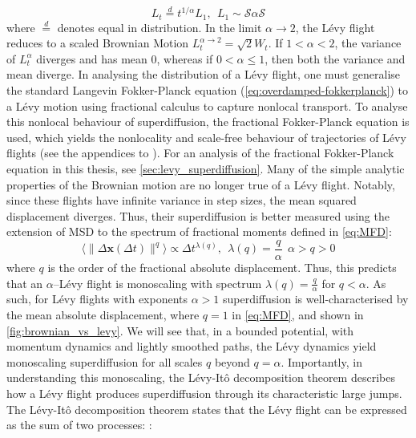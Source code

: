 \begin{equation} \label{eq:levy_noise}
	L_t \stackrel{d}{=} t^{1/\alpha} L_1, \ \ L_1 \sim \mathcal{S}\alpha\mathcal{S}
\end{equation}
where $\stackrel{d}{=}$ denotes equal in distribution. In the limit $\alpha \rightarrow 2$, the Lévy flight reduces to a scaled Brownian Motion $L_t^{\alpha \rightarrow 2} = \sqrt{2}W_t$. If $1 < \alpha < 2$, the variance of $L_t^{\alpha}$ diverges and has mean 0, whereas if $0 < \alpha \leq 1$, then both the variance and mean diverge. In analysing the distribution of a Lévy flight, one must generalise the standard Langevin Fokker-Planck equation (\ref{eq:overdamped-fokkerplanck}) to a Lévy motion using fractional calculus to capture nonlocal transport. To analyse this nonlocal behaviour of superdiffusion, the fractional Fokker-Planck equation is used, which yields the nonlocality and scale-free behaviour of trajectories of Lévy flights (see the appendices to \cite{qi_fractional_2022}). For an analysis of the fractional Fokker-Planck equation in this thesis, see \cref{sec:levy_superdiffusion}. Many of the simple analytic properties of the Brownian motion are no longer true of a Lévy flight. Notably, since these flights have infinite variance in step sizes, the mean squared displacement diverges. Thus, their superdiffusion is better measured using the extension of MSD to the spectrum of fractional moments defined in \cref{eq:MFD}:
\begin{equation}\label{eq:levy-MFD}
	\langle \| \Delta \textbf{x}( \Delta t) \| ^ q \rangle \propto \Delta t^{\lambda(q)}, \ \ \lambda(q) = \frac{q}{\alpha} \ \ \alpha > q > 0
\end{equation}
where $q$ is the order of the fractional absolute displacement. Thus, this predicts that an $\alpha$--Lévy flight is monoscaling with spectrum $\lambda(q) = \frac{q}{\alpha}$ for $q < \alpha$. As such, for Lévy flights with exponents $\alpha > 1$ superdiffusion is well-characterised by the mean absolute displacement, where $q=1$ in \cref{eq:MFD}, and shown in \cref{fig:brownian_vs_levy}. We will see that, in a bounded potential, with momentum dynamics and lightly smoothed paths, the Lévy dynamics yield monoscaling superdiffusion for all scales $q$ beyond $ q=\alpha$. Importantly, in understanding this monoscaling, the Lévy-Itô decomposition theorem describes how a Lévy flight produces superdiffusion through its characteristic large jumps. The Lévy-Itô decomposition theorem states that the Lévy flight can be expressed as the sum of two processes: \cite{Kyprianou2014}:
